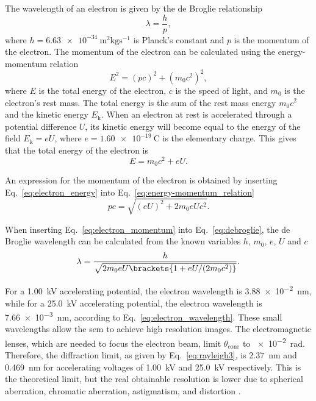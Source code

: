 The wavelength of an electron is given by the de Broglie relationship \citep{de1924recherches}
\begin{equation}
\label{eq:debroglie}
\lambda = \frac{h}{p},
\end{equation}
where $h=\SI{6.63e-34}{\metre^2\kilo\gram\second^{-1}}$ is Planck's constant and $p$ is the momentum of the electron. The momentum of the electron can be calculated using the energy-momentum relation
\begin{equation}
\label{eq:energy-momentum_relation}
E^2 = (pc)^2 + (m_0c^2)^2,
\end{equation}
where $E$ is the total energy of the electron, $c$ is the speed of light, and $m_0$ is the electron's rest mass. The total energy is the sum of the rest mass energy $m_0c^2$ and the kinetic energy $E_\mathrm{k}$. When an electron at rest is accelerated through a potential difference $U$, its kinetic energy  will become equal to the energy of the field $E_\textrm{k} = e U$, where $e=\SI{1.60e-19}{\coulomb}$ is the elementary charge. This gives that the total energy of the electron is
\begin{equation}
\label{eq:electron_energy}
E = m_0c^2 + eU.
\end{equation}

An expression for the momentum of the electron is obtained by inserting Eq.~\eqref{eq:electron_energy} into Eq.~\eqref{eq:energy-momentum_relation}
\begin{equation}
\label{eq:electron_momentum}
pc = \sqrt{(eU)^2 + 2m_0eUc^2}.
\end{equation}

When inserting Eq.~\ref{eq:electron_momentum} into Eq.~\ref{eq:debroglie}, the de Broglie wavelength can be calculated from the known variables $h$, $m_0$, $e$, $U$ and $c$
\begin{equation}
\label{eq:electron_wavelength}
\lambda = \frac{h}{\sqrt{2m_0eU\brackets{1 + eU/(2m_0c^2)}}}.
\end{equation}

For a \SI{1.00}{\kilo\volt} accelerating potential, the electron wavelength is \SI{3.88e-2}{\nano\metre}, while for a \SI{25.0}{\kilo\volt} accelerating potential, the electron wavelength is \SI{7.66e-3}{\nano\metre}, according to Eq.~\ref{eq:electron_wavelength}. These small wavelengths allow the \ac{sem} to achieve high resolution images. The electromagnetic lenses, which are needed to focus the electron beam, limit $\theta_\text{cone}$ to \SI{e-2}{\radian}. Therefore, the diffraction limit, as given by Eq.~\eqref{eq:rayleigh3}, is \SI{2.37}{\nano\metre} and \SI{0.469}{\nano\metre} for accelerating voltages of \SI{1.00}{\kilo\volt} and \SI{25.0}{\kilo\volt} respectively. This is the theoretical limit, but the real obtainable resolution is lower due to spherical aberration, chromatic aberration, astigmatism, and distortion \citep{brandon2013microstructural}.

